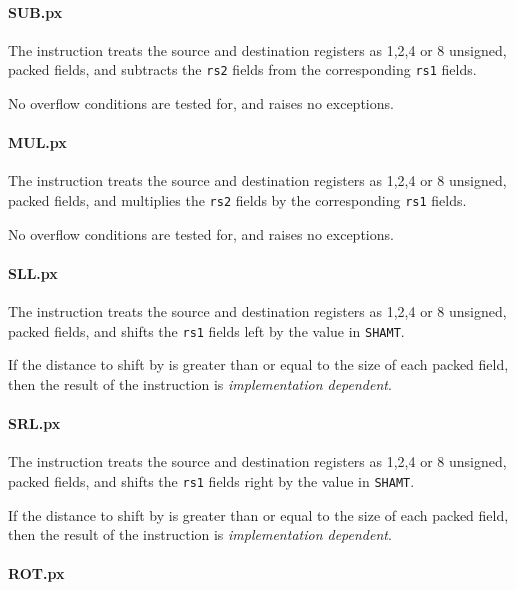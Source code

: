 \paragraph{SUB.px}

The instruction  treats the source and destination registers as
1,2,4 or 8 unsigned, packed fields, and subtracts the {\tt rs2} fields from
the corresponding {\tt rs1} fields.

No overflow conditions are tested for, and  raises no exceptions.

\paragraph{MUL.px}

The instruction  treats the source and destination registers as
1,2,4 or 8 unsigned, packed fields, and multiplies the {\tt rs2} fields by
the corresponding {\tt rs1} fields.

No overflow conditions are tested for, and  raises no exceptions.

\paragraph{SLL.px}

The instruction  treats the source and destination registers as
1,2,4 or 8 unsigned, packed fields, and shifts the {\tt rs1} fields left
by the value in {\tt SHAMT}.

If the distance to shift by is greater than or equal to the size of each
packed field, then the result of the  instruction is
{\em implementation dependent}.

\paragraph{SRL.px}

The instruction  treats the source and destination registers as
1,2,4 or 8 unsigned, packed fields, and shifts the {\tt rs1} fields right
by the value in {\tt SHAMT}.

If the distance to shift by is greater than or equal to the size of each
packed field, then the result of the  instruction is
{\em implementation dependent}.

\paragraph{ROT.px}

